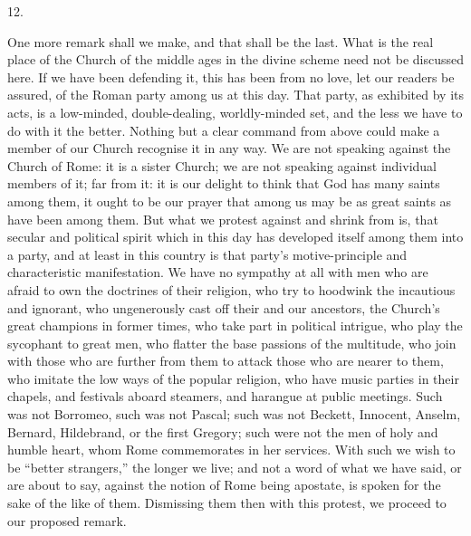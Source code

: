 12.

One more remark shall we make, and that shall be the last. What is
the real place of the Church of the middle ages in the divine scheme
need not be discussed here. If we have been defending it, this has
been from no love, let our readers be assured, of the Roman party
among us at this day. That party, as exhibited by its acts, is a
low-minded, double-dealing, worldly-minded set, and the less we have
to do with it the better. Nothing but a clear command from above could
make a member of our Church recognise it in any way. We are not
speaking against the Church of Rome: it is a sister Church; we
are not speaking against individual members of it; far from it: it is
our delight to think that God has many saints among them, it ought to
be our prayer that among us may be as great saints as have been among
them. But what we protest against and shrink from is, that secular and
political spirit which in this day has developed itself among them
into a party, and at least in this country is that party's
motive-principle and characteristic manifestation. We have no sympathy
at all with men who are afraid to own the doctrines of their religion,
who try to hoodwink the incautious and ignorant, who ungenerously cast
off their and our ancestors, the Church's great champions in former
times, who take part in political intrigue, who play the sycophant to
great men, who flatter the base passions of the multitude, who join
with those who are further from them to attack those who are nearer to
them, who imitate the low ways of the popular religion, who have music
parties in their chapels, and festivals aboard steamers, and harangue
at public meetings. Such was not Borromeo, such was not Pascal; such
was not Beckett, Innocent, Anselm, Bernard, Hildebrand, or the first
Gregory; such were not the men of holy and humble heart, whom Rome
commemorates in her services. With such we wish to be ``better
strangers,'' the longer we live; and not a word of what we have
said, or are about to say, against the notion of Rome being apostate,
is spoken for the sake of the like of them. Dismissing them then with
this protest, we proceed to our proposed remark.

